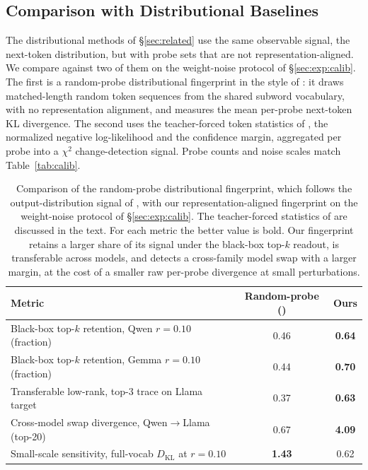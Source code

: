 \documentclass[11pt]{article}
\theoremstyle{definition}
\begin{document}
\subsection{Comparison with Distributional Baselines}
\label{sec:exp:baselines}

The distributional methods of \S\ref{sec:related} use the same observable
signal, the next-token distribution, but with probe sets that are not
representation-aligned. We compare against two of them on the weight-noise
protocol of \S\ref{sec:exp:calib}. The first is a random-probe distributional
fingerprint in the style of \citet{onetoken}: it draws matched-length random
token sequences from the shared subword vocabulary, with no representation
alignment, and measures the mean per-probe next-token KL divergence. The second
uses the teacher-forced token statistics of \citet{rpi}, the normalized
negative log-likelihood and the confidence margin, aggregated per probe into a
$\chi^2$ change-detection signal. Probe counts and noise scales match
Table~\ref{tab:calib}.

\begin{table}[t]
\centering
\small
\caption{Comparison of the random-probe distributional fingerprint, which
follows the output-distribution signal of \citet{onetoken}, with our
representation-aligned fingerprint on the weight-noise protocol of
\S\ref{sec:exp:calib}. The teacher-forced statistics of \citet{rpi} are
discussed in the text. For each metric the better value is bold. Our fingerprint
retains a larger share of its signal under the black-box top-$k$ readout, is
transferable across models, and detects a cross-family model swap with a larger
margin, at the cost of a smaller raw per-probe divergence at small
perturbations.}
\label{tab:compare}
\begin{tabular}{lcc}
\toprule
Metric & Random-probe (\citealp{onetoken}) & Ours \\
\midrule
Black-box top-$k$ retention, Qwen $r{=}0.10$ (fraction) & 0.46 & \textbf{0.64} \\
Black-box top-$k$ retention, Gemma $r{=}0.10$ (fraction) & 0.44 & \textbf{0.70} \\
Transferable low-rank, top-3 trace on Llama target & 0.37 & \textbf{0.63} \\
Cross-model swap divergence, Qwen$\to$Llama (top-20) & 0.67 & \textbf{4.09} \\
\midrule
Small-scale sensitivity, full-vocab $D_{\mathrm{KL}}$ at $r{=}0.10$ & \textbf{1.43} & 0.62 \\
\bottomrule
\end{tabular}
\end{table}
\end{document}
